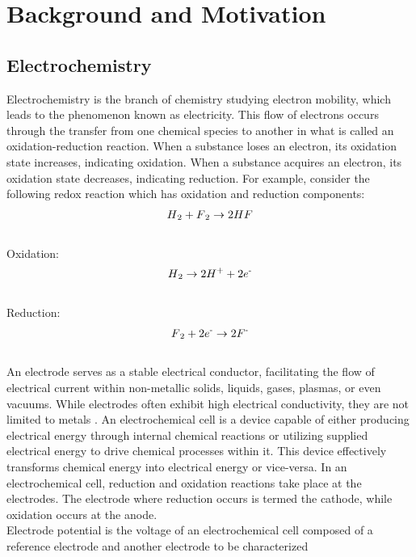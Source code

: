 \chapter{Background and Motivation} \label{chap:chap-1}



\section{Electrochemistry}
Electrochemistry is the branch of chemistry studying electron mobility, which leads to the phenomenon known as electricity. This flow of electrons occurs through the transfer from one chemical species to another in what is called an oxidation-reduction reaction. When a substance loses an electron, its oxidation state increases, indicating oxidation. When a substance acquires an electron, its oxidation state decreases, indicating reduction. For example, consider the following redox reaction which has oxidation and reduction components:\\
\begin{align}
H\textsubscript{2} + F\textsubscript{2} \to 2HF
\end{align}\\
Oxidation:\\
\begin{align}
H\textsubscript{2} \to 2H\textsuperscript{+} + 2e\textsuperscript{-}
\end{align}\\
Reduction: \\
\begin{align}
F\textsubscript{2} + 2e\textsuperscript{-} \to 2F\textsuperscript{-}
\end{align}\\
An electrode serves as a stable electrical conductor, facilitating the flow of electrical current within non-metallic solids, liquids, gases, plasmas, or even vacuums. While electrodes often exhibit high electrical conductivity, they are not limited to metals \cite{Faraday_1970}. An electrochemical cell is a device capable of either producing electrical energy through internal chemical reactions or utilizing supplied electrical energy to drive chemical processes within it. This device effectively transforms chemical energy into electrical energy or vice-versa. In an electrochemical cell, reduction and oxidation reactions take place at the electrodes. The electrode where reduction occurs is termed the cathode, while oxidation occurs at the anode.\\
Electrode potential is the voltage of an electrochemical cell composed of a reference electrode and another electrode to be characterized \cite{goldbook}

